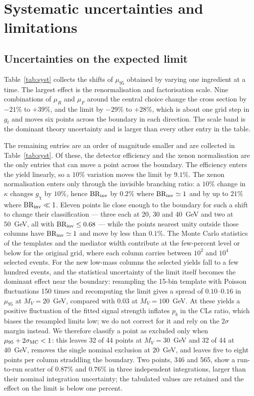 \section{Systematic uncertainties and limitations}\label{sec:sys}

\subsection{Uncertainties on the expected limit}

Table~\ref{tab:syst} collects the shifts of $\mu_{95}$ obtained by varying one ingredient at a time. The largest effect is the renormalisation and factorisation scale. Nine combinations of $\mu_R$ and $\mu_F$ around the central choice change the cross section by $-21\%$ to $+39\%$, and the limit by $-29\%$ to $+28\%$, which is about one grid step in $g_t$ and moves six points across the boundary in each direction. The scale band is the dominant theory uncertainty and is larger than every other entry in the table.

The remaining entries are an order of magnitude smaller and are collected in Table~\ref{tab:syst}. Of these, the detector efficiency and the xenon normalisation are the only entries that can move a point across the boundary. The efficiency enters the yield linearly, so a $10\%$ variation moves the limit by $9.1\%$. The xenon normalisation enters only through the invisible branching ratio: a $10\%$ change in $\kappa$ changes $g_\chi$ by $10\%$, hence ${\rm BR_{inv}}$ by $0.2\%$ where ${\rm BR_{inv}}\simeq1$ and by up to $21\%$ where ${\rm BR_{inv}}\ll1$. Eleven points lie close enough to the boundary for such a shift to change their classification — three each at 20, 30 and 40~GeV and two at 50~GeV, all with ${\rm BR_{inv}}\le0.68$ — while the points nearest unity outside those columns have ${\rm BR_{inv}}\simeq1$ and move by less than $0.1\%$. The Monte Carlo statistics of the templates and the mediator width contribute at the few-percent level or below for the original grid, where each column carries between $10^2$ and $10^4$ selected events. For the new low-mass columns the selected yields fall to a few hundred events, and the statistical uncertainty of the limit itself becomes the dominant effect near the boundary: resampling the 15-bin template with Poisson fluctuations 150 times and recomputing the limit gives a spread of $0.10$--$0.16$ in $\mu_{95}$ at $M_V=20$~GeV, compared with $0.03$ at $M_V=100$~GeV. At these yields a positive fluctuation of the fitted signal strength inflates $p_b$ in the CLs ratio, which biases the resampled limits low; we do not correct for it and rely on the $2\sigma$ margin instead. We therefore classify a point as excluded only when $\mu_{95}+2\sigma_{\rm MC}<1$: this leaves 32 of 44 points at $M_V=30$~GeV and 32 of 44 at 40~GeV, removes the single nominal exclusion at $20$~GeV, and leaves five to eight points per column straddling the boundary. Two points, 346 and 565, show a run-to-run scatter of $0.87\%$ and $0.76\%$ in three independent integrations, larger than their nominal integration uncertainty; the tabulated values are retained and the effect on the limit is below one percent.

